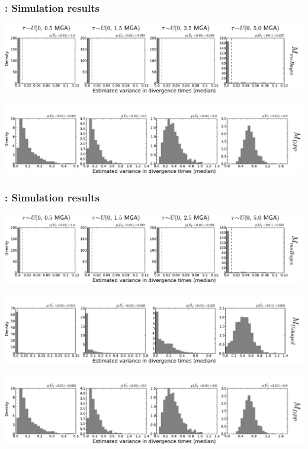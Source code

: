 \begin{frame}[t]
    \frametitle{\dppmsbayes: Simulation results}
    \vspace{1cm}
        \centerline{
        \includegraphics[width=1.13\textwidth]{images/old_old_power_omega_median.pdf}}
        \vspace{0mm}
        \centerline{
        \includegraphics[width=1.13\textwidth]{images/old_dpp_power_omega_median_headless.pdf}}
\end{frame}

\begin{frame}
    \frametitle{\dppmsbayes: Simulation results}
        \centerline{
        \includegraphics[width=\textwidth]{images/old_old_power_omega_median.pdf}}
        \vspace{0mm}
        \centerline{
        \includegraphics[width=\textwidth]{images/old_u-shaped_power_omega_median_headless.pdf}}
        \vspace{0mm}
        \centerline{
        \includegraphics[width=\textwidth]{images/old_dpp_power_omega_median_headless.pdf}}
\end{frame}

